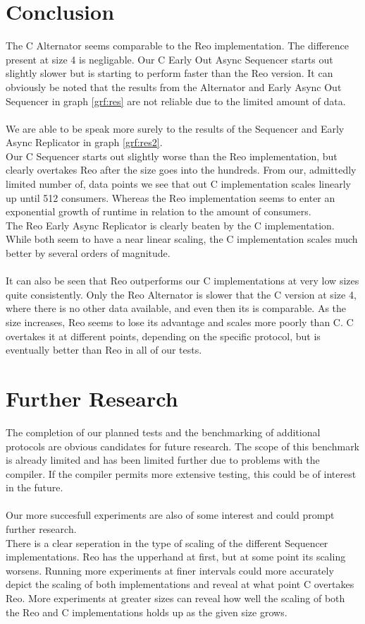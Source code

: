 \section{Conclusion}
The C Alternator seems comparable to the Reo implementation. The difference present at size 4 is negligable. Our C Early Out Async Sequencer starts out slightly slower but is starting to perform faster than the Reo version. It can obviously be noted that the results from the Alternator and Early Async Out Sequencer in graph \ref{grf:res} are not reliable due to the limited amount of data.\\\\
%
We are able to be speak more surely to the results of the Sequencer and Early Async Replicator in graph \ref{grf:res2}. \\
Our C Sequencer starts out slightly worse than the Reo implementation, but clearly overtakes Reo after the size goes into the hundreds. From our, admittedly limited number of, data points we see that out C implementation scales linearly up until 512 consumers. Whereas the Reo implementation seems to enter an exponential growth of runtime in relation to the amount of consumers.\\
The Reo Early Async Replicator is clearly beaten by the C implementation. While both seem to have a near linear scaling, the C implementation scales much better by several orders of magnitude.\\\\
%
It can also be seen that Reo outperforms our C implementations at very low sizes quite consistently. Only the Reo Alternator is slower that the C version at size 4, where there is no other data available, and even then its is comparable. As the size increases, Reo seems to lose its advantage and scales more poorly than C. C overtakes it at different points, depending on the specific protocol, but is eventually better than Reo in all of our tests.

\section{Further Research}
The completion of our planned tests and the benchmarking of additional protocols are obvious candidates for future research. The scope of this benchmark is already limited and has been limited further due to problems with the compiler. If the compiler permits more extensive testing, this could be of interest in the future.\\\\
%
Our more succesfull experiments are also of some interest and could prompt further research.\\
There is a clear seperation in the type of scaling of the different Sequencer implementations. Reo has the upperhand at first, but at some point its scaling worsens. Running more experiments at finer intervals could more accurately depict the scaling of both implementations and reveal at what point C overtakes Reo. More experiments at greater sizes can reveal how well the scaling of both the Reo and C implementations holds up as the given size grows.
